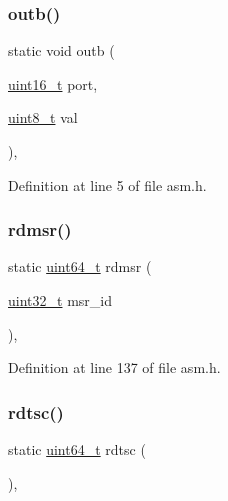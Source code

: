 \subsubsection{\texorpdfstring{outb()}{outb()}}
{\footnotesize\ttfamily static void outb (\begin{DoxyParamCaption}\item[{\hyperlink{a00038_adf4d876453337156dde61095e1f20223_adf4d876453337156dde61095e1f20223}{uint16\+\_\+t}}]{port,  }\item[{\hyperlink{a00038_aba7bc1797add20fe3efdf37ced1182c5_aba7bc1797add20fe3efdf37ced1182c5}{uint8\+\_\+t}}]{val }\end{DoxyParamCaption})\hspace{0.3cm}{\ttfamily [inline]}, {\ttfamily [static]}}



Definition at line 5 of file asm.\+h.

\mbox{\label{a00014_a6fa28502e33e305c4335fe3032dc7799_a6fa28502e33e305c4335fe3032dc7799}} 
\subsubsection{\texorpdfstring{rdmsr()}{rdmsr()}}
{\footnotesize\ttfamily static \hyperlink{a00038_aaa5d1cd013383c889537491c3cfd9aad_aaa5d1cd013383c889537491c3cfd9aad}{uint64\+\_\+t} rdmsr (\begin{DoxyParamCaption}\item[{\hyperlink{a00038_a435d1572bf3f880d55459d9805097f62_a435d1572bf3f880d55459d9805097f62}{uint32\+\_\+t}}]{msr\+\_\+id }\end{DoxyParamCaption})\hspace{0.3cm}{\ttfamily [inline]}, {\ttfamily [static]}}



Definition at line 137 of file asm.\+h.

\mbox{\label{a00014_a47b9d70be3022fd0b5687d9794ca47bc_a47b9d70be3022fd0b5687d9794ca47bc}} 
\subsubsection{\texorpdfstring{rdtsc()}{rdtsc()}}
{\footnotesize\ttfamily static \hyperlink{a00038_aaa5d1cd013383c889537491c3cfd9aad_aaa5d1cd013383c889537491c3cfd9aad}{uint64\+\_\+t} rdtsc (\begin{DoxyParamCaption}{ }\end{DoxyParamCaption})\hspace{0.3cm}{\ttfamily [inline]}, {\ttfamily [static]}}



